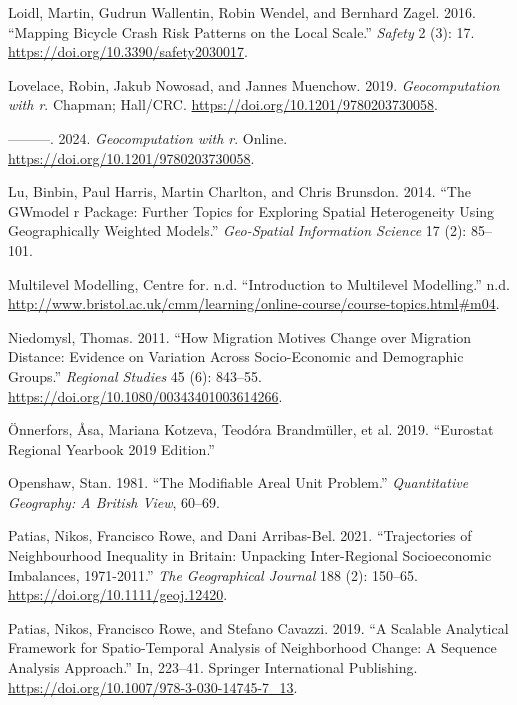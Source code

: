 \documentclass[
  letterpaper,
  DIV=11,
  numbers=noendperiod,
  oneside]{scrreprt}
\newlength{\cslhangindent}
\newenvironment{CSLReferences}[2] %
 {\begin{list}{}{%
  \setlength{\itemindent}{0pt}
  \setlength{\leftmargin}{0pt}
  \setlength{\parsep}{0pt}
  \ifodd #1
   \setlength{\leftmargin}{\cslhangindent}
   \setlength{\itemindent}{-1\cslhangindent}
  \fi
  \setlength{\itemsep}{#2\baselineskip}}}
 {\end{list}}
\begin{document}
\begin{CSLReferences}{1}{0}
Loidl, Martin, Gudrun Wallentin, Robin Wendel, and Bernhard Zagel. 2016.
{``Mapping Bicycle Crash Risk Patterns on the Local Scale.''}
\emph{Safety} 2 (3): 17. \url{https://doi.org/10.3390/safety2030017}.

Lovelace, Robin, Jakub Nowosad, and Jannes Muenchow. 2019.
\emph{Geocomputation with r}. Chapman; Hall/CRC.
\url{https://doi.org/10.1201/9780203730058}.

---------. 2024. \emph{Geocomputation with r}. Online.
\url{https://doi.org/10.1201/9780203730058}.

Lu, Binbin, Paul Harris, Martin Charlton, and Chris Brunsdon. 2014.
{``The GWmodel r Package: Further Topics for Exploring Spatial
Heterogeneity Using Geographically Weighted Models.''} \emph{Geo-Spatial
Information Science} 17 (2): 85--101.

Multilevel Modelling, Centre for. n.d. {``Introduction to Multilevel
Modelling.''} n.d.
\url{http://www.bristol.ac.uk/cmm/learning/online-course/course-topics.html\#m04}.

Niedomysl, Thomas. 2011. {``How Migration Motives Change over Migration
Distance: Evidence on Variation Across Socio-Economic and Demographic
Groups.''} \emph{Regional Studies} 45 (6): 843--55.
\url{https://doi.org/10.1080/00343401003614266}.

Önnerfors, Åsa, Mariana Kotzeva, Teodóra Brandmüller, et al. 2019.
{``Eurostat Regional Yearbook 2019 Edition.''}

Openshaw, Stan. 1981. {``The Modifiable Areal Unit Problem.''}
\emph{Quantitative Geography: A British View}, 60--69.

Patias, Nikos, Francisco Rowe, and Dani Arribas-Bel. 2021.
{``Trajectories of Neighbourhood Inequality in Britain: Unpacking
Inter{-}Regional Socioeconomic Imbalances, 1971{-}2011.''} \emph{The
Geographical Journal} 188 (2): 150--65.
\url{https://doi.org/10.1111/geoj.12420}.

Patias, Nikos, Francisco Rowe, and Stefano Cavazzi. 2019. {``A Scalable
Analytical Framework for Spatio-Temporal Analysis of Neighborhood
Change: A Sequence Analysis Approach.''} In, 223--41. Springer
International Publishing.
\url{https://doi.org/10.1007/978-3-030-14745-7_13}.


\end{CSLReferences}
\end{document}
